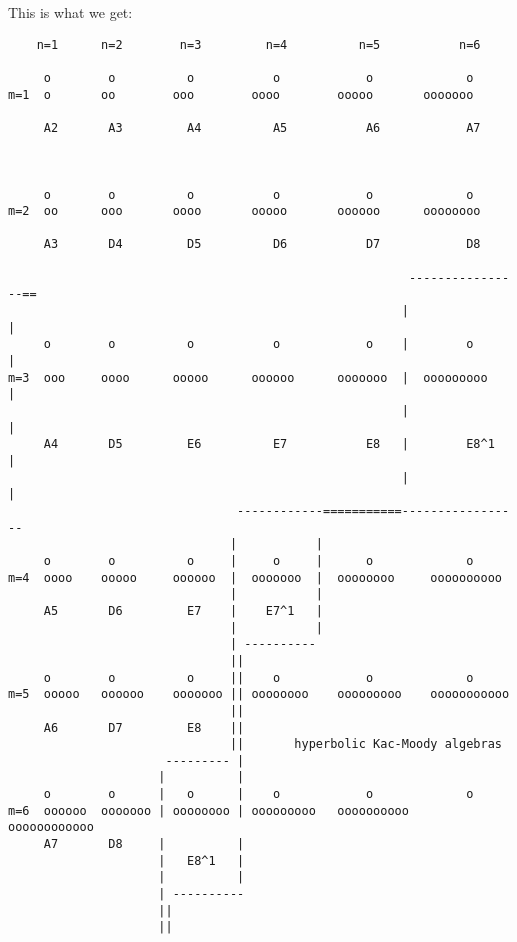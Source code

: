 This is what we get:

\begin{verbatim}
    n=1      n=2        n=3         n=4          n=5           n=6

     o        o          o           o            o             o   
m=1  o       oo        ooo        oooo        ooooo       ooooooo
    
     A2       A3         A4          A5           A6            A7

 

     o        o          o           o            o             o   
m=2  oo      ooo       oooo       ooooo       oooooo      oooooooo

     A3       D4         D5          D6           D7            D8

                                                        ----------------==
                                                       |               |
     o        o          o           o            o    |        o      |
m=3  ooo     oooo      ooooo      oooooo      ooooooo  |  ooooooooo    |
                                                       |               |
     A4       D5         E6          E7           E8   |        E8^1   |
                                                       |               |
                                ------------===========-----------------
                               |           |
     o        o          o     |     o     |      o             o   
m=4  oooo    ooooo     oooooo  |  ooooooo  |  oooooooo     oooooooooo
                               |           |
     A5       D6         E7    |    E7^1   |       
                               |           |
                               | ----------
                               ||
     o        o          o     ||    o            o             o   
m=5  ooooo   oooooo    ooooooo || oooooooo    ooooooooo    ooooooooooo
                               ||
     A6       D7         E8    ||   
                               ||       hyperbolic Kac-Moody algebras
                      --------- |         
                     |          |
     o        o      |   o      |    o            o             o   
m=6  oooooo  ooooooo | oooooooo | ooooooooo   oooooooooo   oooooooooooo  
     A7       D8     |          |
                     |   E8^1   |
                     |          |
                     | ----------
                     ||
                     ||
\end{verbatim}
    
